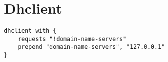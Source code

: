 \section{Dhclient}



\begin{lstlisting}[style=Groovy,caption={Dhclient script example.}]
dhclient with {
    requests "!domain-name-servers"
    prepend "domain-name-servers", "127.0.0.1"
}
\end{lstlisting}
